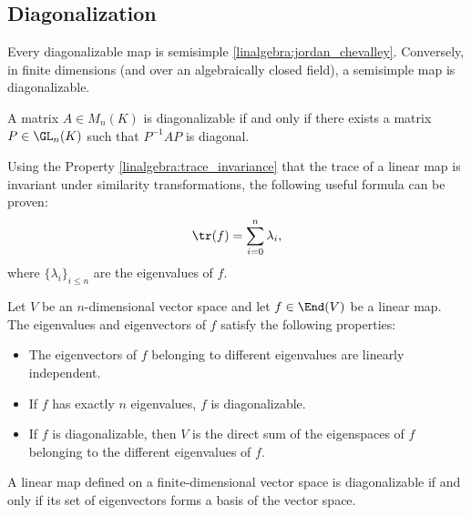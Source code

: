 \subsection{Diagonalization}

    \begin{property}
        Every diagonalizable map is semisimple \ref{linalgebra:jordan_chevalley}. Conversely, in finite dimensions (and over an algebraically closed field), a semisimple map is diagonalizable.
    \end{property}

    \begin{theorem}\label{linalgebra:diagonalizable_PQP}
        A matrix $A\in M_n(K)$ is diagonalizable if and only if there exists a matrix $P\in\GL_n(K)$ such that $P^{-1}AP$ is diagonal.
    \end{theorem}
    \begin{result}[Trace]
        Using the Property \ref{linalgebra:trace_invariance} that the trace of a linear map is invariant under similarity transformations, the following useful formula can be proven:
        \begin{gather}
            \tr(f) = \sum_{i=0}^n\lambda_i,
        \end{gather}
        where $\{\lambda_i\}_{i\leq n}$ are the eigenvalues of $f$.
    \end{result}

    \begin{property}\label{linalgebra:diagonalization_properties}
        Let $V$ be an $n$-dimensional vector space and let $f\in\End(V)$ be a linear map. The eigenvalues and eigenvectors of $f$ satisfy the following properties:
        \begin{itemize}
            \item The eigenvectors of $f$ belonging to different eigenvalues are linearly independent.
            \item If $f$ has exactly $n$ eigenvalues, $f$ is diagonalizable.
            \item If $f$ is diagonalizable, then $V$ is the direct sum of the eigenspaces of $f$ belonging to the different eigenvalues of $f$.
        \end{itemize}
    \end{property}
    \begin{theorem}\label{linalgebra:diagonalizable_basis}
        A linear map defined on a finite-dimensional vector space is diagonalizable if and only if its set of eigenvectors forms a basis of the vector space.
    \end{theorem}

